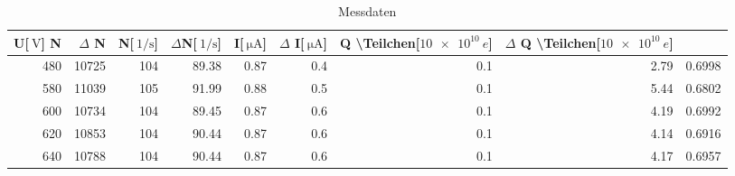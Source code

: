 
\begin{table}[!h]
\begin{center}
\begin{tabular}{|r|r|r|r|r|r|r|r|r|}
\hline
U[$\SI{}{\volt}$] N & $\Delta$ N & N[$\SI{}{1\per\second}$] & $\Delta$N[$\SI{}{1\per\second}$] & I[$\SI{}{\micro\ampere}$] & $\Delta$ I[$\SI{}{\micro\ampere}$] & Q \backslash Teilchen[$\SI{10 e10}{e}$] & $\Delta$ Q \backslash Teilchen[$\SI{10 e10}{e}$] \\
\hline
\hline
480	 &   10725 & 104 & 89.38  & 0.87 &	0.4	& 0.1 & 2.79 & 0.6998\\
580	 &   11039 & 105 & 91.99  & 0.88 &	0.5	& 0.1 & 5.44 & 0.6802\\
600	 &   10734 & 104 & 89.45  & 0.87 &	0.6	& 0.1 & 4.19 & 0.6992\\
620	 &   10853 & 104 & 90.44	& 0.87 &	0.6	& 0.1 & 4.14 & 0.6916\\
640	 &   10788 & 104 & 90.44	& 0.87 &	0.6	& 0.1 & 4.17 & 0.6957\\
\hline
\end{tabular}
\caption[Aufgabe e]{Messdaten}
\label{tabellee}
\end{center}
\end{table}
